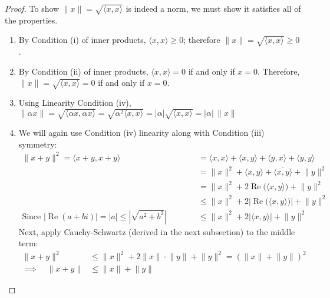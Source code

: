 \documentclass[12pt]{book}
\numberwithin{equation}{section} %
\theoremstyle{plain}
\theoremstyle{definition}
\theoremstyle{remark}
\renewcommand{\Re}{\operatorname{Re}}
\begin{document}
\begin{proof}
To show $\lVert x \rVert =\sqrt{\langle x,x\rangle}$ is indeed a norm,
we must show it satisfies all of the properties.
\begin{enumerate}[label=(\roman*)]
  \item By Condition (i) of inner products, $\langle x,x \rangle\geq 0$;
    therefore $\lVert x\rVert = \sqrt{\langle x,x \rangle} \geq 0$.
  \item By Condition (ii) of inner products, $\langle x,x \rangle= 0$ if
    and only if $x=0$. Therefore, $\lVert x\rVert = \sqrt{\langle x,x
    \rangle} = 0$ if and only if $x=0$.
  \item Using Linearity Condition (iv),
      $\lVert \alpha x\rVert
      = \sqrt{\langle \alpha x, \alpha x\rangle}
      = \sqrt{\alpha^2\langle x, x \rangle}
      = |\alpha|\sqrt{\langle x, x \rangle}
      = |\alpha|\, \lVert x\rVert$
  \item We will again use Condition (iv) linearity along with Condition
    (iii) symmetry:
    \begin{align*}
      \lVert x+y\rVert^2
      =
      \langle x+y, x+y\rangle
      &=
      \langle x, x\rangle
      +
      \langle x, y\rangle
      +
      \langle y, x\rangle
      +
      \langle y, y\rangle
      \\
      &=
      \lVert x\rVert^2
      +
      \langle x, y\rangle
      +
      \overline{\langle x, y\rangle}
      +
      \lVert y\rVert^2
      \\
      &=
      \lVert x\rVert^2
      +
      2\Re\big( \langle x, y\rangle\big)
      +
      \lVert y\rVert^2
      \\
      &\leq
      \lVert x\rVert^2
      +
      2\left\lvert\Re\big( \langle x, y\rangle\big)\right\rvert
      +
      \lVert y\rVert^2
      \\
      \text{Since $|\Re(a+bi)|=|a| \leq \left\lvert\sqrt{a^2+b^2}\right\rvert$}\qquad\quad
      &\leq
      \lVert x\rVert^2
      +
      2\left\lvert\langle x, y\rangle\right\rvert
      +
      \lVert y\rVert^2
    \end{align*}
    Next, apply Cauchy-Schwartz (derived in the next subsection) to the
    middle term:
    \begin{align*}
      \lVert x+y\rVert^2
      &\leq
      \lVert x\rVert^2
      +
      2\lVert x\rVert\cdot\lVert y\rVert
      +
      \lVert y\rVert^2
      =
      \left(
      \lVert x\rVert
      +
      \lVert y\rVert
      \right)^2
      \\
      \implies\quad
      \lVert x+y\rVert
      &\leq
      \lVert x\rVert
      +
      \lVert y\rVert
    \end{align*}

\end{enumerate}
\end{proof}
\end{document}
